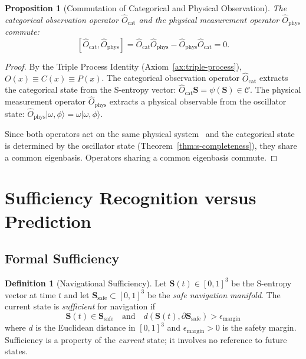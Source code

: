 \documentclass[twocolumn,10pt]{article}
\newtheorem{proposition}[theorem]{Proposition}
\theoremstyle{definition}
\newtheorem{definition}[theorem]{Definition}
\theoremstyle{remark}
\newcommand{\Sent}{\mathbf{S}}
\newcommand{\Ocat}{\hat{O}_{\mathrm{cat}}}
\newcommand{\Ophys}{\hat{O}_{\mathrm{phys}}}
\begin{document}
\begin{proposition}[Commutation of Categorical and Physical Observation]\label{prop:commutation}
The categorical observation operator $\Ocat$ and the physical measurement
operator $\Ophys$ commute:
\begin{equation}\label{eq:commutation}
  [\Ocat, \Ophys] = \Ocat \Ophys - \Ophys \Ocat = 0.
\end{equation}
\end{proposition}

\begin{proof}
By the Triple Process Identity (Axiom~\ref{ax:triple-process}),
$O(x) \equiv C(x) \equiv P(x)$. The categorical observation operator
$\Ocat$ extracts the categorical state from the S-entropy vector:
$\Ocat \Sent = \psi(\Sent) \in \mathcal{C}$. The physical measurement
operator $\Ophys$ extracts a physical observable from the oscillator
state: $\Ophys |\omega, \phi\rangle = \omega |\omega, \phi\rangle$.

Since both operators act on the same physical
system~\cite{sachikonye2026poincare} and the categorical state is
determined by the oscillator state (Theorem~\ref{thm:s-completeness}),
they share a common eigenbasis. Operators sharing a common eigenbasis
commute.
\end{proof}


\section{Sufficiency Recognition versus Prediction}\label{sec:sufficiency}

\subsection{Formal Sufficiency}

\begin{definition}[Navigational Sufficiency]\label{def:sufficiency}
Let $\Sent(t) \in [0,1]^3$ be the S-entropy vector at time $t$ and let
$\Sent_{\mathrm{safe}} \subset [0,1]^3$ be the \emph{safe navigation
manifold}. The current state is \emph{sufficient} for navigation if
\begin{equation}\label{eq:sufficiency}
  \Sent(t) \in \Sent_{\mathrm{safe}} \quad \text{and} \quad
  d(\Sent(t), \partial \Sent_{\mathrm{safe}}) > \epsilon_{\mathrm{margin}}
\end{equation}
where $d$ is the Euclidean distance in $[0,1]^3$ and
$\epsilon_{\mathrm{margin}} > 0$ is the safety margin. Sufficiency is a
property of the \emph{current} state; it involves no reference to future
states.
\end{definition}
\end{document}
